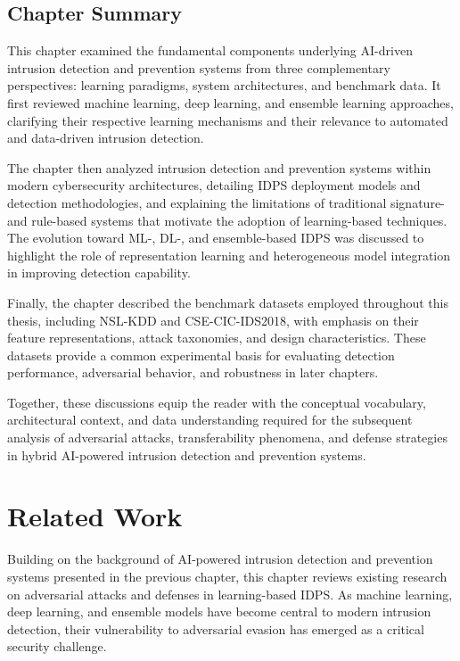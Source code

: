 \documentclass[12pt, a4paper, reqno, oneside]{book}
\begin{document}
\section{Chapter Summary}

This chapter examined the fundamental components underlying AI-driven intrusion detection and prevention systems from three complementary perspectives: learning paradigms, system architectures, and benchmark data. It first reviewed machine learning, deep learning, and ensemble learning approaches, clarifying their respective learning mechanisms and their relevance to automated and data-driven intrusion detection.

The chapter then analyzed intrusion detection and prevention systems within modern cybersecurity architectures, detailing IDPS deployment models and detection methodologies, and explaining the limitations of traditional signature- and rule-based systems that motivate the adoption of learning-based techniques. The evolution toward ML-, DL-, and ensemble-based IDPS was discussed to highlight the role of representation learning and heterogeneous model integration in improving detection capability.

Finally, the chapter described the benchmark datasets employed throughout this thesis, including NSL-KDD and CSE-CIC-IDS2018, with emphasis on their feature representations, attack taxonomies, and design characteristics. These datasets provide a common experimental basis for evaluating detection performance, adversarial behavior, and robustness in later chapters.

Together, these discussions equip the reader with the conceptual vocabulary, architectural context, and data understanding required for the subsequent analysis of adversarial attacks, transferability phenomena, and defense strategies in hybrid AI-powered intrusion detection and prevention systems.


\chapter{Related Work}
\label{chap:related}

Building on the background of AI-powered intrusion detection and prevention systems presented in the previous chapter, this chapter reviews existing research on adversarial attacks and defenses in learning-based IDPS. As machine learning, deep learning, and ensemble models have become central to modern intrusion detection, their vulnerability to adversarial evasion has emerged as a critical security challenge.
\end{document}
